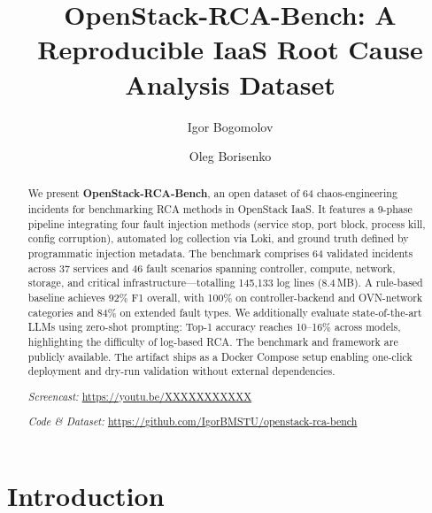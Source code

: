 \documentclass[sigconf,review]{acmart}
\begin{document}
\title{OpenStack-RCA-Bench: A Reproducible IaaS Root Cause Analysis Dataset}

\author{Igor Bogomolov}

\author{Oleg Borisenko}

\begin{abstract}
We present \textbf{OpenStack-RCA-Bench}, an open dataset of 64 chaos-engineering incidents for benchmarking RCA methods in OpenStack IaaS. It features a 9-phase pipeline integrating four fault injection methods (service stop, port block, process kill, config corruption), automated log collection via Loki, and ground truth defined by programmatic injection metadata. The benchmark comprises 64 validated incidents across 37 services and 46 fault scenarios spanning controller, compute, network, storage, and critical infrastructure---totalling 145{,}133 log lines (8.4\,MB). A rule-based baseline achieves 92\% F1 overall, with 100\% on controller-backend and OVN-network categories and 84\% on extended fault types. We additionally evaluate state-of-the-art LLMs using zero-shot prompting: Top-1 accuracy reaches 10--16\% across models, highlighting the difficulty of log-based RCA. The benchmark and framework are publicly available. The artifact ships as a Docker Compose setup enabling one-click deployment and dry-run validation without external dependencies.

\textit{Screencast:} \url{https://youtu.be/XXXXXXXXXXX}

\textit{Code \& Dataset:} \url{https://github.com/IgorBMSTU/openstack-rca-bench}
\end{abstract}



\maketitle

\section{Introduction}
\label{sec:introduction}
\end{document}
